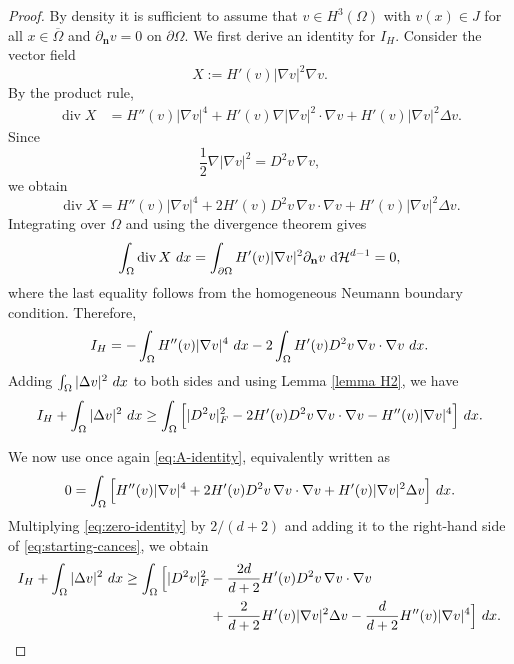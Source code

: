 \documentclass[10pt,a4paper]{amsart}
\newcommand{\dx}{\textup{d}x}
\begin{document}
\begin{proof}
By density it is sufficient to assume that $v \in H^3(\Omega)$ with 
$v(x)\in J$ for all $x\in\overline{\Omega}$ and
$\partial_{\mathbf{n}} v=0$ on $\partial \Omega$.
We first derive an identity for $I_H$. Consider the vector field
\[
    X:=H'(v)|\nabla v|^2\nabla v.
\]
By the product rule,
\begin{align*}
    \operatorname{div}X
    &=
    H''(v)|\nabla v|^4
    +
    H'(v)\nabla|\nabla v|^2\cdot\nabla v
    +
    H'(v)|\nabla v|^2\Delta v.
\end{align*}
Since
\[
    \frac12\nabla|\nabla v|^2=D^2v\,\nabla v,
\]
we obtain
\[
    \operatorname{div}X
    =
    H''(v)|\nabla v|^4
    +
    2H'(v)  D^2v\,\nabla v \cdot \nabla v
    +
    H'(v)|\nabla v|^2\Delta v.
\]
Integrating over $\Omega$ and using the divergence theorem gives
\[
    \int_\Omega\operatorname{div}X\ \dx
    =
    \int_{\partial\Omega}
    H'(v)|\nabla v|^2\partial_{\mathbf{n}} v\ 
    \mathrm{d}\mathcal H^{d-1}
    =
    0,
\]
where the last equality follows from the homogeneous Neumann boundary
condition. Therefore,
\begin{equation}
\label{eq:A-identity}
    I_H
    =
    -\int_\Omega H''(v)|\nabla v|^4\ \dx
    -
    2\int_\Omega
    H'(v)
     D^2v\,\nabla v \cdot \nabla v \ \dx.
\end{equation}
Adding $\int_\Omega|\Delta v|^2\ \dx$ to both sides and using Lemma \ref{lemma H2}, we have
\begin{align}
    I_H+\int_\Omega|\Delta v|^2\ \dx
    \geq
    \int_\Omega
    \Big[
        |D^2v|_F^2
        -
        2H'(v)
         D^2v\,\nabla v \cdot \nabla v
        -H''(v)|\nabla v|^4
    \Big] \ \dx.
\label{eq:starting-cances}
\end{align}

We now use once again \eqref{eq:A-identity}, equivalently written as
\begin{equation}
\label{eq:zero-identity}
    0
    =
    \int_\Omega
    \Big[
        H''(v)|\nabla v|^4
        +
        2H'(v)
        D^2v\,\nabla v \cdot \nabla v
        +
        H'(v)|\nabla v|^2\Delta v
    \Big]\ \dx.
\end{equation}
Multiplying \eqref{eq:zero-identity} by $2/(d+2)$ and adding it to
the right-hand side of \eqref{eq:starting-cances}, we obtain
\begin{align}
    I_H+\int_\Omega|\Delta v|^2\ \dx
    \geq
    \int_\Omega
    \Big[
        |D^2v|_F^2
        &-
        \frac{2d}{d+2}
        H'(v)
         D^2v\,\nabla v \cdot \nabla v 
        \nonumber\\
        &+
        \frac{2}{d+2}
        H'(v)|\nabla v|^2\Delta v
        -
        \frac{d}{d+2}
        H''(v)|\nabla v|^4
    \Big] \ \dx.
\label{eq:cances-combination}
\end{align}


\end{proof}
\end{document}
